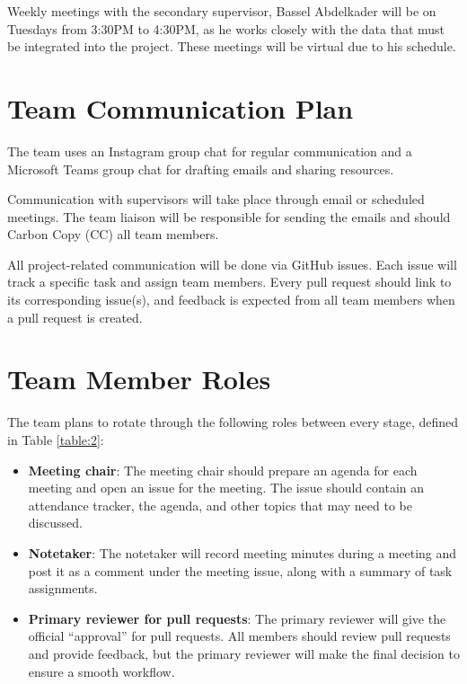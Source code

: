 \documentclass{article}
\begin{document}
\noindent Weekly meetings with the secondary supervisor, Bassel Abdelkader will
be on Tuesdays from 3:30PM to 4:30PM, as he works closely with the data that
must be integrated into the project. These meetings will be virtual due to his
schedule.

\section{Team Communication Plan}

The team uses an Instagram group chat for regular communication and a Microsoft
Teams group chat for drafting emails and sharing resources.\newline

\noindent Communication with supervisors will take place through email or
scheduled meetings. The team liaison will be responsible for sending the emails
and should Carbon Copy (CC) all team members.\newline

\noindent All project-related communication will be done via GitHub issues. Each
issue will track a specific task and assign team members. Every pull request
should link to its corresponding issue(s), and feedback is expected from all
team members when a pull request is created.

\section{Team Member Roles}

The team plans to rotate through the following roles between every stage,
defined in Table \ref{table:2}:

\begin{itemize}
  \item \textbf{Meeting chair}: The meeting chair should prepare an agenda for
  each meeting and open an issue for the meeting. The issue should contain an
  attendance tracker, the agenda, and other topics that may need to be
  discussed.
  \item \textbf{Notetaker}: The notetaker will record meeting minutes during a
  meeting and post it as a comment under the meeting issue, along with a summary
  of task assignments.
  \item \textbf{Primary reviewer for pull requests}: The primary reviewer will
  give the official ``approval'' for pull requests. All members should review
  pull requests and provide feedback, but the primary reviewer will make the
  final decision to ensure a smooth workflow.
\end{itemize}
\end{document}
